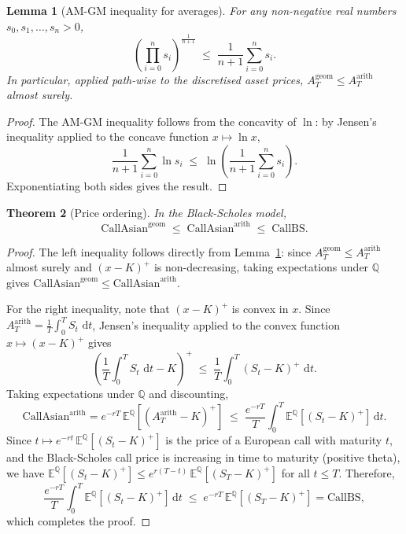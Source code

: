 \documentclass[11pt,a4paper]{article}
\theoremstyle{plain}
\newtheorem{theorem}{Theorem}[section]
\newtheorem{lemma}[theorem]{Lemma}
\theoremstyle{definition}
\newcommand{\E}{\mathbb{E}}
\newcommand{\Q}{\mathbb{Q}}
\newcommand{\dd}{\,\mathrm{d}}
\begin{document}
\begin{lemma}[AM-GM inequality for averages]
\label{lem:amgm}
For any non-negative real numbers $s_0, s_1, \ldots, s_n > 0$,
\begin{equation}
  \left(\prod_{i=0}^{n} s_i\right)^{\!\frac{1}{n+1}}
  \;\le\;
  \frac{1}{n+1}\sum_{i=0}^{n} s_i.
\end{equation}
In particular, applied path-wise to the discretised asset prices,
$A_T^{\mathrm{geom}} \le A_T^{\mathrm{arith}}$ almost surely.
\end{lemma}

\begin{proof}
The AM-GM inequality follows from the concavity of $\ln$: by Jensen's
inequality applied to the concave function $x \mapsto \ln x$,
\[
  \frac{1}{n+1}\sum_{i=0}^{n}\ln s_i
  \;\le\;
  \ln\!\left(\frac{1}{n+1}\sum_{i=0}^{n} s_i\right).
\]
Exponentiating both sides gives the result.
\end{proof}

\begin{theorem}[Price ordering]
\label{thm:order}
In the Black-Scholes model,
\begin{equation}
  \mathrm{CallAsian}^{\mathrm{geom}}
  \;\le\;
  \mathrm{CallAsian}^{\mathrm{arith}}
  \;\le\;
  \mathrm{CallBS}.
\end{equation}
\end{theorem}

\begin{proof}
The left inequality follows directly from Lemma~\ref{lem:amgm}:
since $A_T^{\mathrm{geom}} \le A_T^{\mathrm{arith}}$ almost surely and
$(x-K)^+$ is non-decreasing, taking expectations under $\Q$ gives
$\mathrm{CallAsian}^{\mathrm{geom}} \le \mathrm{CallAsian}^{\mathrm{arith}}$.

For the right inequality, note that $(x - K)^+$ is convex in $x$.
Since $A_T^{\mathrm{arith}} = \frac{1}{T}\int_0^T S_t \, \dd t$,
Jensen's inequality applied to the convex function $x \mapsto (x-K)^+$ gives
\[
  \left(\frac{1}{T}\int_0^T S_t \, \dd t - K\right)^+
  \;\le\;
  \frac{1}{T}\int_0^T (S_t - K)^+ \, \dd t.
\]
Taking expectations under $\Q$ and discounting,
\[
  \mathrm{CallAsian}^{\mathrm{arith}}
  = e^{-rT}\,\E^{\Q}\!\left[\left(A_T^{\mathrm{arith}} - K\right)^+\right]
  \;\le\;
  \frac{e^{-rT}}{T}\int_0^T \E^{\Q}\!\left[(S_t - K)^+\right] \dd t.
\]
Since $t \mapsto e^{-rt}\,\E^{\Q}[(S_t - K)^+]$ is the price of a European
call with maturity $t$, and the Black-Scholes call price is increasing in
time to maturity (positive theta), we have
$\E^{\Q}[(S_t - K)^+] \le e^{r(T-t)}\,\E^{\Q}[(S_T - K)^+]$ for all
$t \le T$. Therefore,
\[
  \frac{e^{-rT}}{T}\int_0^T \E^{\Q}\!\left[(S_t - K)^+\right] \dd t
  \;\le\;
  e^{-rT}\,\E^{\Q}\!\left[(S_T - K)^+\right]
  = \mathrm{CallBS},
\]
which completes the proof.
\end{proof}
\end{document}
